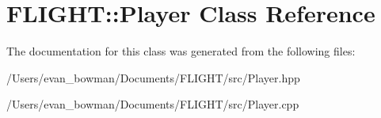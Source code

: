 \hypertarget{class_f_l_i_g_h_t_1_1_player}{}\section{F\+L\+I\+G\+HT\+:\+:Player Class Reference}
\label{class_f_l_i_g_h_t_1_1_player}


The documentation for this class was generated from the following files\+:\begin{DoxyCompactItemize}
\item 
/\+Users/evan\+\_\+bowman/\+Documents/\+F\+L\+I\+G\+H\+T/src/Player.\+hpp\item 
/\+Users/evan\+\_\+bowman/\+Documents/\+F\+L\+I\+G\+H\+T/src/Player.\+cpp\end{DoxyCompactItemize}
